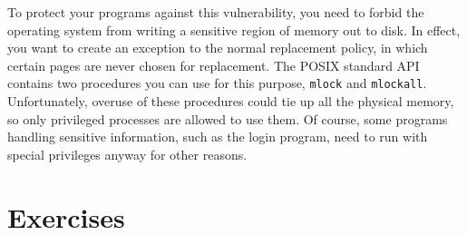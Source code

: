 To protect your programs against this vulnerability, you need to
forbid the operating system from writing a sensitive region of memory
out to disk.  In effect, you want to create an exception to the normal
replacement policy, in which certain pages are never chosen for
replacement.  The POSIX standard API contains two procedures you can
use for this purpose, \verb|mlock| and
\verb|mlockall|.  Unfortunately,
overuse of these procedures could tie up all the physical memory, so
only privileged processes are allowed to use them.  Of course, some
programs handling sensitive information, such as the login program,
need to run with special privileges anyway for other reasons.

\section*{Exercises}
